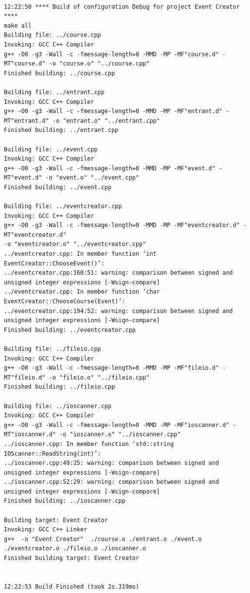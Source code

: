 \documentclass{article}
\begin{document}
\begin{center}
	\begin{lstlisting}[showstringspaces=false, caption={Build log of the C++ Event Creation Program}]
	
12:22:50 **** Build of configuration Debug for project Event Creator ****
make all 
Building file: ../course.cpp
Invoking: GCC C++ Compiler
g++ -O0 -g3 -Wall -c -fmessage-length=0 -MMD -MP -MF"course.d" -MT"course.d" -o "course.o" "../course.cpp"
Finished building: ../course.cpp
 
Building file: ../entrant.cpp
Invoking: GCC C++ Compiler
g++ -O0 -g3 -Wall -c -fmessage-length=0 -MMD -MP -MF"entrant.d" -MT"entrant.d" -o "entrant.o" "../entrant.cpp"
Finished building: ../entrant.cpp
 
Building file: ../event.cpp
Invoking: GCC C++ Compiler
g++ -O0 -g3 -Wall -c -fmessage-length=0 -MMD -MP -MF"event.d" -MT"event.d" -o "event.o" "../event.cpp"
Finished building: ../event.cpp
 
Building file: ../eventcreator.cpp
Invoking: GCC C++ Compiler
g++ -O0 -g3 -Wall -c -fmessage-length=0 -MMD -MP -MF"eventcreator.d" -MT"eventcreator.d" 
-o "eventcreator.o" "../eventcreator.cpp"
../eventcreator.cpp: In member function ‘int EventCreator::ChooseEvent()’:
../eventcreator.cpp:160:51: warning: comparison between signed and unsigned integer expressions [-Wsign-compare]
../eventcreator.cpp: In member function ‘char EventCreator::ChooseCourse(Event)’:
../eventcreator.cpp:194:52: warning: comparison between signed and unsigned integer expressions [-Wsign-compare]
Finished building: ../eventcreator.cpp
 
Building file: ../fileio.cpp
Invoking: GCC C++ Compiler
g++ -O0 -g3 -Wall -c -fmessage-length=0 -MMD -MP -MF"fileio.d" -MT"fileio.d" -o "fileio.o" "../fileio.cpp"
Finished building: ../fileio.cpp
 
Building file: ../ioscanner.cpp
Invoking: GCC C++ Compiler
g++ -O0 -g3 -Wall -c -fmessage-length=0 -MMD -MP -MF"ioscanner.d" -MT"ioscanner.d" -o "ioscanner.o" "../ioscanner.cpp"
../ioscanner.cpp: In member function ‘std::string IOScanner::ReadString(int)’:
../ioscanner.cpp:49:25: warning: comparison between signed and unsigned integer expressions [-Wsign-compare]
../ioscanner.cpp:52:29: warning: comparison between signed and unsigned integer expressions [-Wsign-compare]
Finished building: ../ioscanner.cpp
 
Building target: Event Creator
Invoking: GCC C++ Linker
g++  -o "Event Creator"  ./course.o ./entrant.o ./event.o ./eventcreator.o ./fileio.o ./ioscanner.o   
Finished building target: Event Creator
 

12:22:53 Build Finished (took 2s.319ms)
		
	\end{lstlisting}
\end{center}
\end{document}
